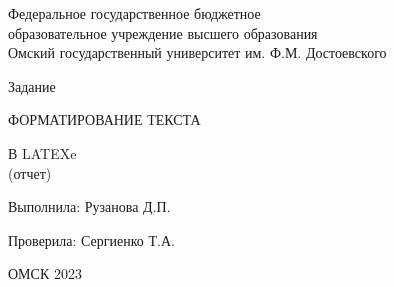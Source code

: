\documentclass[a4paper]{article}
\begin{document}
Федеральное государственное бюджетное
\\
образовательное учреждение высшего образования
\\
Омский государственный университет им. Ф.М. Достоевского

\vspace*{15\baselineskip}
Задание

ФОРМАТИРОВАНИЕ ТЕКСТА 

В LATEXe \\


(отчет)

\vspace*{11\baselineskip}
Выполнила: Рузанова Д.П.

Проверила: Сергиенко Т.А.
\vspace*{13\baselineskip}

ОМСК 2023
\end{document}
